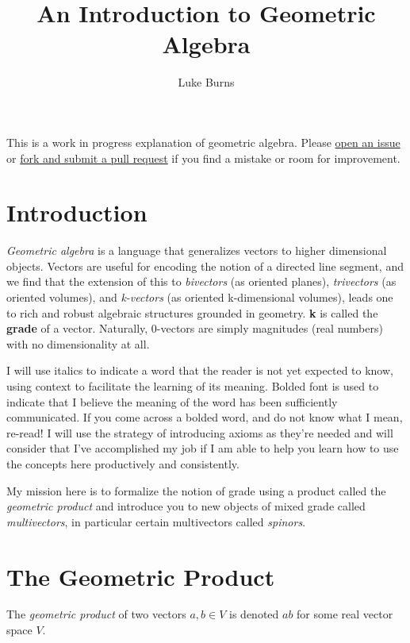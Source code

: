 \documentclass{article}
\title{An Introduction to Geometric Algebra}
\author{Luke Burns}
\begin{document}
\maketitle

This is a work in progress explanation of geometric algebra. Please
\href{https://github.com/lukeburns/geometric-algebra/issues}{open an
issue} or
\href{https://github.com/lukeburns/geometric-algebra/pulls}{fork and
submit a pull request} if you find a mistake or room for improvement.

\section{Introduction}\label{introduction}

\emph{Geometric algebra} is a language that generalizes vectors to
higher dimensional objects. Vectors are useful for encoding the notion
of a directed line segment, and we find that the extension of this to
\emph{bivectors} (as oriented planes), \emph{trivectors} (as oriented
volumes), and \emph{k-vectors} (as oriented k-dimensional volumes),
leads one to rich and robust algebraic structures grounded in geometry.
\textbf{k} is called the \textbf{grade} of a vector. Naturally,
0-vectors are simply magnitudes (real numbers) with no dimensionality at
all.

I will use italics to indicate a word that the reader is not yet
expected to know, using context to facilitate the learning of its
meaning. Bolded font is used to indicate that I believe the meaning of
the word has been sufficiently communicated. If you come across a bolded
word, and do not know what I mean, re-read! I will use the strategy of
introducing axioms as they're needed and will consider that I've
accomplished my job if I am able to help you learn how to use the
concepts here productively and consistently.

My mission here is to formalize the notion of grade using a product
called the \emph{geometric product} and introduce you to new objects of
mixed grade called \emph{multivectors}, in particular certain
multivectors called \emph{spinors}.

\section{The Geometric Product}\label{the-geometric-product}

The \emph{geometric product} of two vectors $a, b \in V$ is denoted
$ab$ for some real vector space $V$.
\end{document}
